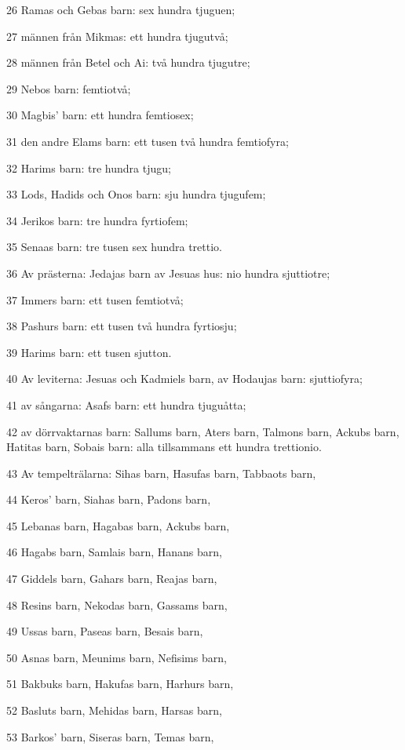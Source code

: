 \par 26 Ramas och Gebas barn: sex hundra tjuguen;
\par 27 männen från Mikmas: ett hundra tjugutvå;
\par 28 männen från Betel och Ai: två hundra tjugutre;
\par 29 Nebos barn: femtiotvå;
\par 30 Magbis' barn: ett hundra femtiosex;
\par 31 den andre Elams barn: ett tusen två hundra femtiofyra;
\par 32 Harims barn: tre hundra tjugu;
\par 33 Lods, Hadids och Onos barn: sju hundra tjugufem;
\par 34 Jerikos barn: tre hundra fyrtiofem;
\par 35 Senaas barn: tre tusen sex hundra trettio.
\par 36 Av prästerna: Jedajas barn av Jesuas hus: nio hundra sjuttiotre;
\par 37 Immers barn: ett tusen femtiotvå;
\par 38 Pashurs barn: ett tusen två hundra fyrtiosju;
\par 39 Harims barn: ett tusen sjutton.
\par 40 Av leviterna: Jesuas och Kadmiels barn, av Hodaujas barn: sjuttiofyra;
\par 41 av sångarna: Asafs barn: ett hundra tjuguåtta;
\par 42 av dörrvaktarnas barn: Sallums barn, Aters barn, Talmons barn, Ackubs barn, Hatitas barn, Sobais barn: alla tillsammans ett hundra trettionio.
\par 43 Av tempelträlarna: Sihas barn, Hasufas barn, Tabbaots barn,
\par 44 Keros' barn, Siahas barn, Padons barn,
\par 45 Lebanas barn, Hagabas barn, Ackubs barn,
\par 46 Hagabs barn, Samlais barn, Hanans barn,
\par 47 Giddels barn, Gahars barn, Reajas barn,
\par 48 Resins barn, Nekodas barn, Gassams barn,
\par 49 Ussas barn, Paseas barn, Besais barn,
\par 50 Asnas barn, Meunims barn, Nefisims barn,
\par 51 Bakbuks barn, Hakufas barn, Harhurs barn,
\par 52 Basluts barn, Mehidas barn, Harsas barn,
\par 53 Barkos' barn, Siseras barn, Temas barn,
